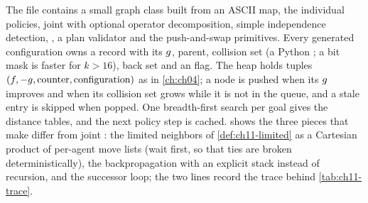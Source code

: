 The file  contains a small graph class built from an
ASCII map, the individual policies, joint \astar with optional operator
decomposition, simple independence detection, \mstar, a plan validator and
the push-and-swap primitives. Every generated configuration owns a record
with its $g$, parent, collision set (a Python ; a bit mask is
faster for $k > 16$), back set and an  flag. The heap holds
tuples $(f, -g, \text{counter}, \text{configuration})$ as in
\cref{ch:ch04}; a node is pushed when its $g$ improves and when its
collision set grows while it is not in the queue, and a stale entry is
skipped when popped. One breadth-first search per goal gives the distance
tables, and the next policy step is cached.  shows the
three pieces that make \mstar differ from joint \astar: the limited
neighbors of \cref{def:ch11-limited} as a Cartesian product of per-agent
move lists (wait first, so
that ties are broken deterministically), the backpropagation with an
explicit stack instead of recursion, and the successor loop; the two
 lines record the trace behind \cref{tab:ch11-trace}.

